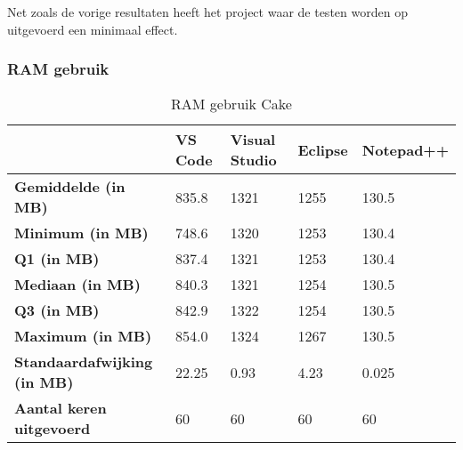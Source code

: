 Net zoals de vorige resultaten heeft het project waar de testen worden op uitgevoerd een minimaal effect.

\newpage

\subsubsection{RAM gebruik}
\begin{table}[h]
	\centering
	\begin{tabular}{ l l l l l }
		\hline
		                                    & \textbf{VS Code} & \textbf{Visual Studio} & \textbf{Eclipse} & \textbf{Notepad++} \\
		\hline
		\textbf{Gemiddelde (in MB)}         & 835.8            & 1321                   & 1255             & 130.5              \\[1ex]

		\textbf{Minimum (in MB) }           & 748.6            & 1320                   & 1253             & 130.4              \\
		\textbf{Q1 (in MB)}                 & 837.4            & 1321                   & 1253             & 130.4              \\
		\textbf{Mediaan (in MB)}            & 840.3            & 1321                   & 1254             & 130.5              \\
		\textbf{Q3 (in MB)}                 & 842.9            & 1322                   & 1254             & 130.5              \\
		\textbf{Maximum (in MB)}            & 854.0            & 1324                   & 1267             & 130.5              \\[1ex]

		\textbf{Standaardafwijking (in MB)} & 22.25            & 0.93                   & 4.23             & 0.025              \\
		\textbf{Aantal keren uitgevoerd}    & 60               & 60                     & 60               & 60                 \\
		\hline
	\end{tabular}
	\caption{RAM gebruik Cake}
	\label{tab:resultatenRAMCake}
\end{table}

